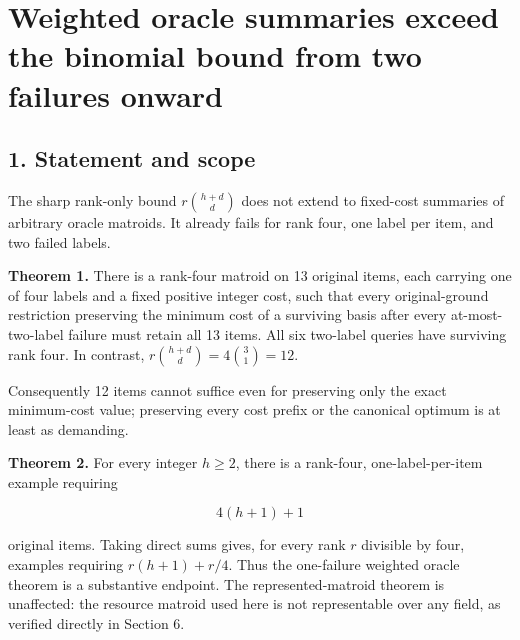
\hypertarget{af-f44144c751-weighted-oracle-summaries-exceed-the-binomial-bound-from-two-failures-onward}{%
\section{Weighted oracle summaries exceed the binomial bound from two failures onward}\label{af-f44144c751-weighted-oracle-summaries-exceed-the-binomial-bound-from-two-failures-onward}}

\hypertarget{af-f44144c751-statement-and-scope}{%
\subsection{1. Statement and scope}\label{af-f44144c751-statement-and-scope}}

The sharp rank-only bound \(r\binom{h+d}{d}\) does not extend to fixed-cost summaries of arbitrary oracle matroids. It already fails for rank four, one label per item, and two failed labels.

\textbf{Theorem 1.} There is a rank-four matroid on 13 original items, each carrying one of four labels and a fixed positive integer cost, such that every original-ground restriction preserving the minimum cost of a surviving basis after every at-most-two-label failure must retain all 13 items. All six two-label queries have surviving rank four. In contrast, \(r\binom{h+d}{d}=4\binom{3}{1}=12\).

Consequently 12 items cannot suffice even for preserving only the exact minimum-cost value; preserving every cost prefix or the canonical optimum is at least as demanding.

\textbf{Theorem 2.} For every integer \(h\ge2\), there is a rank-four, one-label-per-item example requiring

\[
4(h+1)+1
\tag{WO1}
\]

original items. Taking direct sums gives, for every rank \(r\) divisible by four, examples requiring \(r(h+1)+r/4\). Thus the one-failure weighted oracle theorem is a substantive endpoint. The represented-matroid theorem is unaffected: the resource matroid used here is not representable over any field, as verified directly in Section 6.

